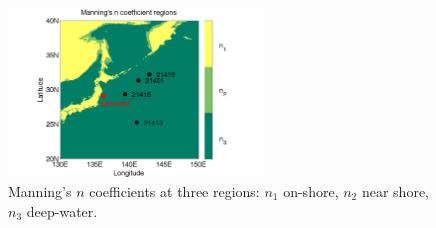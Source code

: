 \documentclass[review,12pt]{elsarticle}
\begin{document}
\begin{figure}[ht]      
\centering
\includegraphics[width=0.6\textwidth]{Figure1.pdf}
\caption{Manning's $n$ coefficients at three regions: $n_1$ on-shore, $n_2$ near shore, $n_3$ deep-water.}
\label{fig:ceofs}
\end{figure}  
\end{document}
